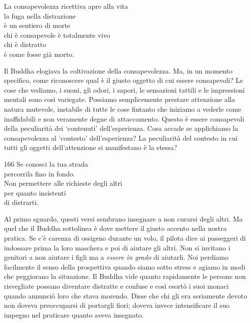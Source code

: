 

\begin{dhpVerse}{21}
\label{dhp-21}
La consapevolezza ricettiva apre alla vita\\
la fuga nella distrazione\\
è un sentiero di morte\\
chi è consapevole è totalmente vivo\\
chi è distratto\\
è come fosse già morto.
\end{dhpVerse}

\begin{dhpRefl}
  Il Buddha elogiava la coltivazione della consapevolezza. Ma, in un momento
  specifico, come riconoscere qual è il giusto oggetto di cui essere
  consapevoli? Le cose che vediamo, i suoni, gli odori, i sapori, le sensazioni
  tattili e le impressioni mentali sono così variegate. Possiamo semplicemente
  prestare attenzione alla natura mutevole, instabile di tutte le cose fintanto
  che iniziamo a vederle come inaffidabili e non veramente degne di
  attaccamento. Questo è essere consapevoli della peculiarità dei `contenuti'
  dell'esperienza. Cosa accade se applichiamo la consapevolezza al `contesto'
  dell'esperienza? La peculiarità del contesto in cui tutti gli oggetti
  dell'attenzione si manifestano è la stessa?
\end{dhpRefl}


\begin{dhpVerse}{166}
\label{dhp-166}
Se conosci la tua strada\\
percorrila fino in fondo.\\
Non permettere alle richieste degli altri\\
per quanto insistenti\\
di distrarti.
\end{dhpVerse}

\begin{dhpRefl}
  Al primo sguardo, questi versi sembrano insegnare a non curarsi degli altri.
  Ma quel che il Buddha sottolinea è dove mettere il giusto accento nella nostra
  pratica. Se c’è carenza di ossigeno durante un volo, il pilota dice ai
  passeggeri di indossare prima la loro maschera e poi di aiutare gli altri. Non
  si invitano i genitori a non aiutare i figli ma a \emph{essere in grado} di
  aiutarli. Noi perdiamo facilmente il senso della prospettiva quando siamo
  sotto stress e agiamo in modi che peggiorano la situazione. Il Buddha vide
  quanto rapidamente le persone non risvegliate possano diventare distratte e
  confuse e così esortò i suoi monaci quando annunciò loro che stava morendo.
  Disse che chi gli era seriamente devoto non doveva preoccuparsi di portargli
  fiori; doveva invece intensificare il suo impegno nel praticare quanto aveva
  insegnato.
\end{dhpRefl}

